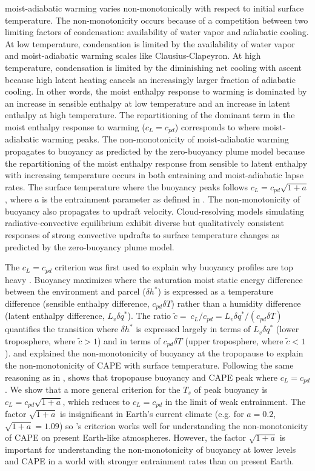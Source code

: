 \documentclass[draft]{ametsocV6.1}
\begin{document}
moist-adiabatic warming varies non-monotonically with respect to initial surface temperature. The non-monotonicity occurs because of a competition between two limiting factors of condensation: availability of water vapor and adiabatic cooling. At low temperature, condensation is limited by the availability of water vapor and moist-adiabatic warming scales like Clausius-Clapeyron. At high temperature, condensation is limited by the diminishing net cooling with ascent because high latent heating cancels an increasingly larger fraction of adiabatic cooling. In other words, the moist enthalpy response to warming is dominated by an increase in sensible enthalpy at low temperature and an increase in latent enthalpy at high temperature. The repartitioning of the dominant term in the moist enthalpy response to warming ($c_L=c_{pd}$) corresponds to where moist-adiabatic warming peaks. The non-monotonicity of moist-adiabatic warming propagates to buoyancy as predicted by the zero-buoyancy plume model because the repartitioning of the moist enthalpy response from sensible to latent enthalpy with increasing temperature occurs in both entraining and moist-adiabatic lapse rates. The surface temperature where the buoyancy peaks follows $c_L = c_{pd} \sqrt{1+a}$, where $a$ is the entrainment parameter as defined in \cite{romps2016}. The non-monotonicity of buoyancy also propagates to updraft velocity. Cloud-resolving models simulating radiative-convective equilibrium exhibit diverse but qualitatively consistent responses of strong convective updrafts to surface temperature changes as predicted by the zero-buoyancy plume model.

The $c_L=c_{pd}$ criterion was first used to explain why buoyancy profiles are top heavy \citep{seeley2016}. Buoyancy maximizes where the saturation moist static energy difference between the environment and parcel ($\delta h^*$) is expressed as a temperature difference (sensible enthalpy difference, $c_{pd}\delta T$) rather than a humidity difference (latent enthalpy difference, $L_v\delta q^*$). The ratio $\tilde{c}= \ c_L / c_{pd} = L_v \delta q^* / (c_{pd} \delta T)$ quantifies the transition where $\delta h^*$ is expressed largely in terms of $L_v \delta q^*$ (lower troposphere, where $\tilde{c}>1$) and in terms of $c_{pd}\delta T$ (upper troposphere, where $\tilde{c}<1$).  and \cite{romps2016} explained the non-monotonicity of buoyancy at the tropopause to explain the non-monotonicity of CAPE with surface temperature. Following the same reasoning as in \cite{seeley2016}, \cite{romps2016} shows that tropopause buoyancy and CAPE peak where $c_L = c_{pd}$. We show that a more general criterion for the $T_s$ of peak buoyancy is $c_L = c_{pd}\sqrt{1+a}$, which reduces to $c_L = c_{pd}$ in the limit of weak entrainment. The factor $\sqrt{1+a}$ is insignificant in Earth's current climate (e.g. for $a=0.2$, $\sqrt{1+a}=1.09$) so \cite{romps2016}'s criterion works well for understanding the non-monotonicity of CAPE on present Earth-like atmospheres. However, the factor $\sqrt{1+a}$ is important for understanding the non-monotonicity of buoyancy at lower levels and CAPE in a world with stronger entrainment rates than on present Earth.
\end{document}
